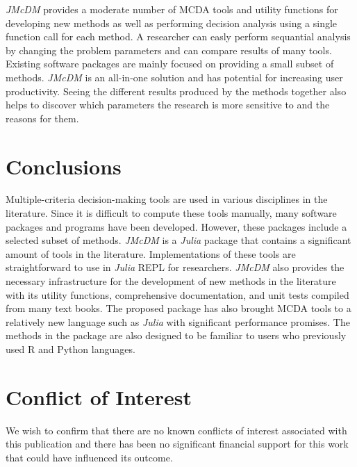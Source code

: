 \documentclass[preprint,review, 12pt, a4paper]{elsarticle}
\begin{document}
\emph{JMcDM} provides a moderate number of MCDA tools and utility functions for developing new methods as well as performing
decision analysis using a single function call for each method. A researcher can easly perform sequantial analysis by changing 
the problem parameters and can compare results of many tools. Existing software packages are mainly focused on providing a 
small subset of methods. \emph{JMcDM} is an all-in-one solution and has potential for increasing user productivity. Seeing 
the different results produced by the methods together also helps to discover which parameters the research is more sensitive 
to and the reasons for them.   

\section{Conclusions}
\label{section:conclusion}
Multiple-criteria decision-making tools are used in various disciplines in the literature. Since it is difficult to compute these tools manually, many software packages and programs have been developed. However, these packages include a selected subset of methods. \emph{JMcDM} is a \emph{Julia} package that contains a significant amount of tools in the literature. Implementations of these tools are straightforward to use in \emph{Julia} REPL for researchers. \emph{JMcDM} also provides the necessary infrastructure for the development of new methods in the literature with its utility functions, comprehensive documentation, and unit tests compiled from many text books. The proposed package has also brought MCDA tools to a relatively new language such as \emph{Julia} with significant performance promises. The methods in the package are also designed to be familiar to users who previously used R and Python languages.

\section{Conflict of Interest}
We wish to confirm that there are no known conflicts of interest associated with this publication and there has been no significant financial support for this work that could have influenced its outcome.
\end{document}
